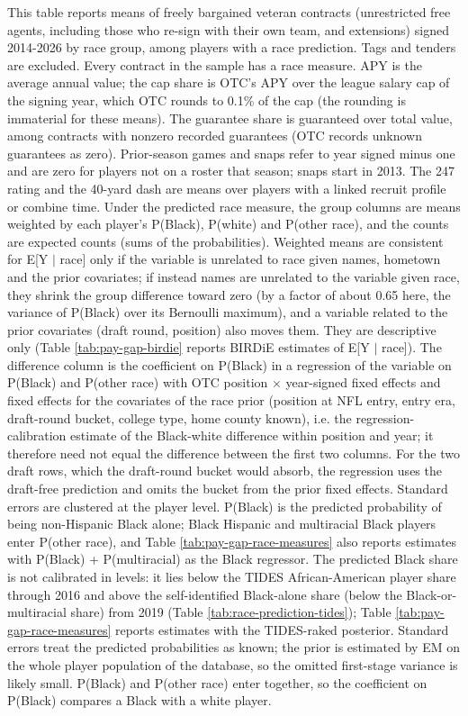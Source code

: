 \begin{table}[!h]
{\begin{threeparttable}
\begin{tablenotes}[para]
\item This table reports means of freely bargained veteran contracts (unrestricted free agents, including those who re-sign with their own team, and extensions) signed 2014-2026 by race group, among players with a race prediction. Tags and tenders are excluded. Every contract in the sample has a race measure. APY is the average annual value; the cap share is OTC's APY over the league salary cap of the signing year, which OTC rounds to 0.1\% of the cap (the rounding is immaterial for these means). The guarantee share is guaranteed over total value, among contracts with nonzero recorded guarantees (OTC records unknown guarantees as zero). Prior-season games and snaps refer to year signed minus one and are zero for players not on a roster that season; snaps start in 2013. The 247 rating and the 40-yard dash are means over players with a linked recruit profile or combine time. Under the predicted race measure, the group columns are means weighted by each player's P(Black), P(white) and P(other race), and the counts are expected counts (sums of the probabilities). Weighted means are consistent for E[Y $|$ race] only if the variable is unrelated to race given names, hometown and the prior covariates; if instead names are unrelated to the variable given race, they shrink the group difference toward zero (by a factor of about 0.65 here, the variance of P(Black) over its Bernoulli maximum), and a variable related to the prior covariates (draft round, position) also moves them. They are descriptive only (Table \ref{tab:pay-gap-birdie} reports BIRDiE estimates of E[Y $|$ race]). The difference column is the coefficient on P(Black) in a regression of the variable on P(Black) and P(other race) with OTC position $\times$ year-signed fixed effects and fixed effects for the covariates of the race prior (position at NFL entry, entry era, draft-round bucket, college type, home county known), i.e. the regression-calibration estimate of the Black-white difference within position and year; it therefore need not equal the difference between the first two columns. For the two draft rows, which the draft-round bucket would absorb, the regression uses the draft-free prediction and omits the bucket from the prior fixed effects. Standard errors are clustered at the player level. P(Black) is the predicted probability of being non-Hispanic Black alone; Black Hispanic and multiracial Black players enter P(other race), and Table \ref{tab:pay-gap-race-measures} also reports estimates with P(Black) + P(multiracial) as the Black regressor. The predicted Black share is not calibrated in levels: it lies below the TIDES African-American player share through 2016 and above the self-identified Black-alone share (below the Black-or-multiracial share) from 2019 (Table \ref{tab:race-prediction-tides}); Table \ref{tab:pay-gap-race-measures} reports estimates with the TIDES-raked posterior. Standard errors treat the predicted probabilities as known; the prior is estimated by EM on the whole player population of the database, so the omitted first-stage variance is likely small. P(Black) and P(other race) enter together, so the coefficient on P(Black) compares a Black with a white player. 
\end{tablenotes}
\end{threeparttable}}
\end{table}
